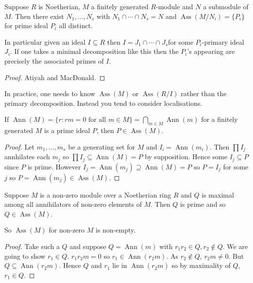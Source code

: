 \documentclass[a4paper]{article}
\DeclareMathOperator{\Ann}{Ann} %
\DeclareMathOperator{\Ass}{Ass} %
\begin{document}
\begin{theorem}
  Suppose \(R\) is Noetherian, \(M\) a finitely generated \(R\)-module and \(N\) a submodule of \(M\). Then there exist \(N_1, \dots, N_s\) with \(N_1 \cap \cdots \cap N_s = N\) and \(\Ass(M/N_i) = \{P_i\}\) for prime ideal \(P_i\) all distinct.

  In particular given an ideal \(I \subseteq R\) then \(I = J_1 \cap \cdots \cap J_s\)for some \(P_i\)-primary ideal \(J_i\). If one takes a minimal decomposition like this then the \(P_i\)'s appearing are precisely the associated primes of \(I\).
\end{theorem}

\begin{proof}
  Atiyah and MacDonald.
\end{proof}

In practice, one needs to know \(\Ass(M)\) or \(\Ass(R/I)\) rather than the primary decomposition. Instead you tend to consider localisations.

\begin{lemma}
  If \(\Ann(M) = \{r: rm = 0 \text{ for all } m \in M\} = \bigcap_{m \in M} \Ann(m)\) for a finitely generated \(M\) is a prime ideal \(P\), then \(P \in \Ass(M)\).
\end{lemma}

\begin{proof}
  Let \(m_1, \dots, m_s\) be a generating set for \(M\) and \(I_i = \Ann(m_i)\). Then \(\prod I_j\) annhilates each \(m_j\) so \(\prod I_j \subseteq \Ann(M) = P\) by supposition. Hence some \(I_j \subseteq P\) since \(P\) is prime. However \(I_j = \Ann(m_j) \supseteq \Ann(M) = P\) so \(P = I_j\) for some \(j\) so \(P = \Ann(m_j) \in \Ass(M)\).
\end{proof}

\begin{lemma}
  Suppose \(M\) is a non-zero module over a Noetherian ring \(R\) and \(Q\) is maximal among all annihilators of non-zero elements of \(M\). Then \(Q\) is prime and so \(Q \in \Ass(M)\).
\end{lemma}
So \(\Ass(M)\) for non-zero \(M\) is non-empty.

\begin{proof}
  Take such a \(Q\) and suppose \(Q = \Ann(m)\) with \(r_1r_2 \in Q, r_2 \notin Q\). We are going to show \(r_1 \in Q\). \(r_1r_2m = 0\) so \(r_1 \in \Ann(r_2m)\). As \(r_2 \notin Q\), \(r_2m \neq 0\). But \(Q \subseteq \Ann(r_2m)\). Hence \(Q\) and \(r_1\) lie in \(\Ann(r_2m)\) so by maximality of \(Q\), \(r_1 \in Q\).
\end{proof}
\end{document}
